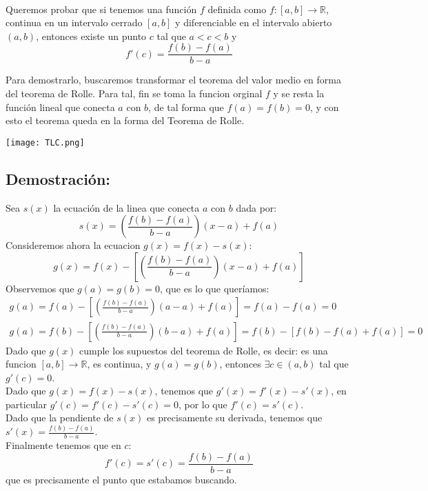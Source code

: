 \documentclass[letter]{article}
\begin{document}
\paragraph{}Queremos probar que si tenemos una función $f$ definida como $f:[a,b]\longrightarrow\mathbb{R}$, continua en un intervalo cerrado $[a,b]$ y diferenciable en el intervalo abierto $(a,b)$, entonces existe un punto $c$ tal que $a<c<b$ y
$$f'(c)=\frac{f(b)-f(a)}{b-a}$$

Para demostrarlo, buscaremos transformar el teorema del valor medio en forma del teorema de Rolle. Para tal, fin se toma la funcion orginal $f$ y se resta la función lineal que conecta $a$ con $b$, de tal forma que $f(a)=f(b)=0$, y con esto el teorema queda en la forma del Teorema de Rolle.

\begin{center}
    \texttt{[image: TLC.png]}
\end{center}

\subsection{Demostración:}

Sea $s(x)$ la ecuación de la linea que conecta $a$ con $b$ dada por:
\begin{equation*}
            s(x)=\left(\frac{f(b)-f(a)}{b-a}\right)(x-a)+f(a)
\end{equation*}
Consideremos ahora la ecuacion $g(x)=f(x)-s(x)$:
\begin{equation*}
            g(x)=f(x)-\left[\left(\frac{f(b)-f(a)}{b-a}\right)(x-a)+f(a)\right]
\end{equation*}
Observemos que $g(a)=g(b)=0$, que es lo que queríamos:
\begin{equation*}
    \begin{split}
        g(a)=f(a)-\left[\left(\frac{f(b)-f(a)}{b-a}\right)(a-a)+f(a)\right]=f(a)-f(a)=0 \\
        g(a)=f(b)-\left[\left(\frac{f(b)-f(a)}{b-a}\right)(b-a)+f(a)\right]=f(b)-\left[f(b)-f(a)+f(a)\right]=0
    \end{split}
\end{equation*}
Dado que $g(x)$ cumple los supuestos del teorema de Rolle, es decir: es una funcion $[a,b]\rightarrow \mathbb{R}$, es continua, y $g(a)=g(b)$, entonces $\exists c\in (a,b)$ tal que $g'(c)=0$.
\vspace{2mm}\\
Dado que $g(x)=f(x)-s(x)$, tenemos que $g'(x)=f'(x)-s'(x)$, en particular $g'(c)=f'(c)-s'(c)=0$, por lo que $f'(c)=s'(c)$.
\vspace{2mm}\\
Dado que la pendiente de $s(x)$ es precisamente su derivada, tenemos que $s'(x)=\frac{f(b)-f(a)}{b-a}$.
\vspace{2mm}\\
Finalmente tenemos que en $c$:
\begin{equation*}
            f'(c)=s'(c)=\frac{f(b)-f(a)}{b-a}
\end{equation*}
que es precisamente el punto que estabamos buscando.
\end{document}

